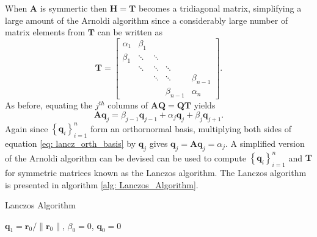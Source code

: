 When $\bm{A}$ is symmertic then $\bm{H} = \bm{T}$ becomes a tridiagonal matrix, simplifying a large amount of the Arnoldi algorithm since a considerably large number of matrix elements from $\bm{T}$ can be written as
\[
    \bm{T} =
    \begin{bmatrix}
        \alpha_1 & \beta_1 &        &             &             \\
        \beta_1  & \ddots  & \ddots &             &             \\
                 & \ddots  & \ddots & \ddots      &             \\
                 &         & \ddots & \ddots      & \beta_{n-1} \\
                 &         &        & \beta_{n-1} & \alpha_{n}
    \end{bmatrix}.
\]
As before, equating the $j^{th}$ columns of $\bm{A} \bm{Q} = \bm{Q} \bm{T}$ yields
\begin{equation}\label{eq: lancz_orth_basis}
    \bm{A} \bm{q}_{j} = \beta_{j-1} \bm{q}_{j-1} + \alpha_{j} \bm{q}_j + \beta_j \bm{q}_{j+1}.
\end{equation}
Again since $\left\{ \bm{q}_{i} \right\}_{i=1}^{n}$ form an orthornormal basis, multiplying both sides of equation \ref{eq: lancz_orth_basis} by $\bm{q}_j$ gives $\bm{q}_j = \bm{A} \bm{q}_j = \alpha_j$. A simplified version of the Arnoldi algorithm can be devised can be used to compute $\left\{ \bm{q}_{i} \right\}_{i=1}^{n}$ and $\bm{T}$ for symmetric matrices known as the Lanczos algorithm. The Lanczos algorithm is presented in algorithm \ref{alg: Lanczos_Algorithm}.

{\centering
\begin{minipage}{.85\linewidth}
    \begin{algorithm}[H]
        \caption{Lanczos Algorithm}
        \label{alg: Lanczos_Algorithm}
        \SetAlgoLined
        \DontPrintSemicolon

        \BlankLine
        $\bm{q}_1 = \bm{r}_0 / \| \bm{r}_0 \|$, $\beta_0 = 0$, $\bm{q}_0 = 0$\;
        \BlankLine
    \end{algorithm}
\end{minipage}
\par
}
